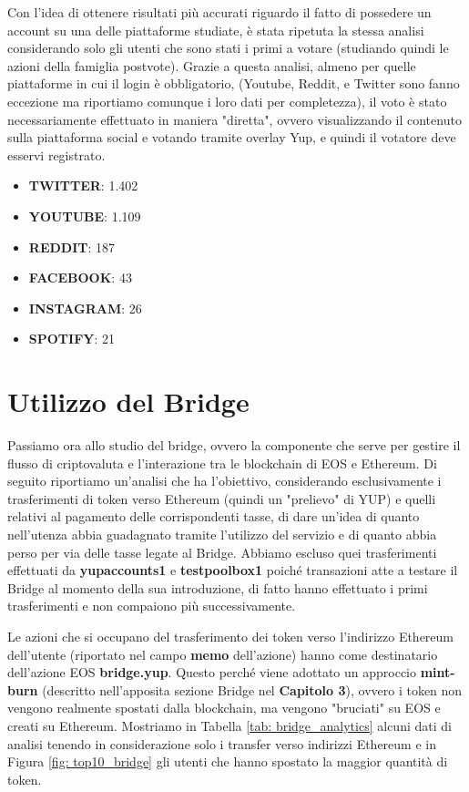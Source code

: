 Con l'idea di ottenere risultati più accurati riguardo il fatto di possedere un account su una delle piattaforme studiate, è stata ripetuta la stessa analisi considerando solo gli utenti che sono stati i primi a votare (studiando quindi le azioni della famiglia postvote).
Grazie a questa analisi, almeno per quelle piattaforme in cui il login è obbligatorio, (Youtube, Reddit, e Twitter sono fanno eccezione ma riportiamo comunque i loro dati per completezza), il voto è stato necessariamente effettuato in maniera "diretta", ovvero visualizzando il contenuto sulla piattaforma social e votando tramite overlay Yup, e quindi il votatore deve esservi registrato.

\begin{itemize}
    \item \textbf{TWITTER}: 1.402
    \item \textbf{YOUTUBE}: 1.109
    \item \textbf{REDDIT}: 187
    \item \textbf{FACEBOOK}: 43
    \item \textbf{INSTAGRAM}: 26
    \item \textbf{SPOTIFY}: 21
\end{itemize}



\section{Utilizzo del Bridge}
Passiamo ora allo studio del bridge, ovvero la componente che serve per gestire il flusso di criptovaluta e l'interazione tra le blockchain di EOS e Ethereum.
Di seguito riportiamo un'analisi che ha l'obiettivo, considerando esclusivamente i trasferimenti di token verso Ethereum (quindi un "prelievo" di YUP) e quelli relativi al pagamento delle corrispondenti tasse, di dare un'idea di quanto nell'utenza abbia guadagnato tramite l'utilizzo del servizio e di quanto abbia perso per via delle tasse legate al Bridge. Abbiamo escluso quei trasferimenti effettuati da \textbf{yupaccounts1} e \textbf{testpoolbox1} poiché transazioni atte a testare il Bridge al momento della sua introduzione, di fatto hanno effettuato i primi trasferimenti e non compaiono più successivamente.


Le azioni che si occupano del trasferimento dei token verso l'indirizzo Ethereum dell'utente (riportato nel campo \textbf{memo} dell'azione) hanno come destinatario dell'azione EOS \textbf{bridge.yup}. Questo perché viene adottato un approccio \textbf{mint-burn} (descritto nell'apposita sezione Bridge nel \textbf{Capitolo 3}), ovvero i token non vengono realmente spostati dalla blockchain, ma vengono "bruciati" su EOS e creati su Ethereum. Mostriamo in Tabella \ref{tab: bridge_analytics} alcuni dati di analisi tenendo in considerazione solo i transfer verso indirizzi Ethereum e in Figura \ref{fig: top10_bridge} gli utenti che hanno spostato la maggior quantità di token.


